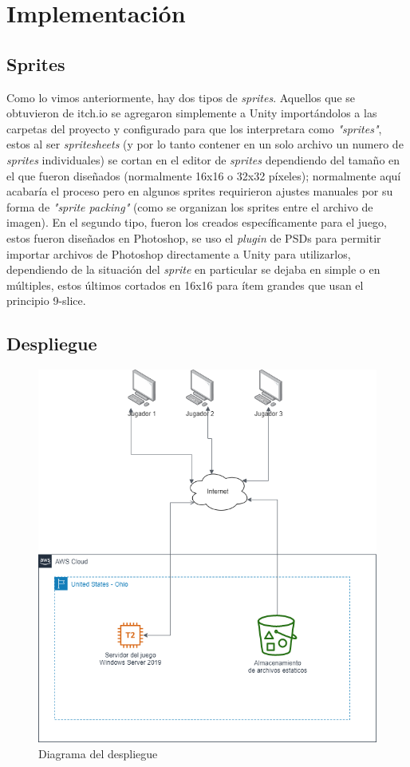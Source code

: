 \section{Implementación}
\subsection{Sprites}
Como lo vimos anteriormente, hay dos tipos de \textit{sprites}. Aquellos que se obtuvieron de itch.io se agregaron simplemente a Unity importándolos a las carpetas del proyecto y configurado para que los interpretara como \textit{"sprites"}, estos al ser \textit{spritesheets} (y por lo tanto contener en un solo archivo un numero de \textit{sprites} individuales) se cortan en el editor de \textit{sprites} dependiendo del tamaño en el que fueron diseñados (normalmente 16x16 o 32x32 píxeles); normalmente aquí acabaría el proceso pero en algunos sprites requirieron ajustes manuales por su forma de \textit{"sprite packing"} (como se organizan los sprites entre el archivo de imagen). En el segundo tipo, fueron los creados específicamente para el juego, estos fueron diseñados en Photoshop, se uso el \textit{plugin} de PSDs para permitir importar archivos de Photoshop directamente a Unity para utilizarlos, dependiendo de la situación del \textit{sprite} en particular se dejaba en simple o en múltiples, estos últimos cortados en  16x16 para ítem grandes que usan el principio 9-slice. 

\subsection{Despliegue}

\begin{figure}[h]
    \centering
    \includegraphics[width=0.5\linewidth]{images/diagrama_deployment.png}
    \caption{Diagrama del despliegue}
    \label{fig:diagrama_despliege}
\end{figure}

